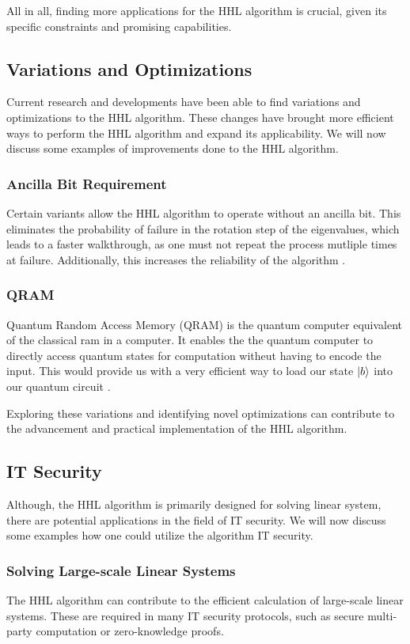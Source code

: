 All in all, finding more applications for the HHL algorithm is crucial, given its specific constraints and promising capabilities.

\subsection{Variations and Optimizations}
Current research and developments have been able to find variations and optimizations to the HHL algorithm.
These changes have brought more efficient ways to perform the HHL algorithm and expand its applicability.
We will now discuss some examples of improvements done to the HHL algorithm.

    \subsubsection{Ancilla Bit Requirement} 
    Certain variants allow the HHL algorithm to operate without an ancilla bit.
    This eliminates the probability of failure in the rotation step of the eigenvalues, which leads to a faster walkthrough, as one must not repeat the process mutliple times at failure.
    Additionally, this increases the reliability of the algorithm \cite{without_ancilla}.

    \subsubsection{QRAM}
    Quantum Random Access Memory (QRAM) is the quantum computer equivalent of the classical ram in a computer.
    It enables the the quantum computer to directly access quantum states for computation witheut having to encode the input. 
    This would provide us with a very efficient way to load our state $\ket b$ into our quantum circuit \cite{qram}.

Exploring these variations and identifying novel optimizations can contribute to the advancement and practical implementation of the HHL algorithm.


\subsection{IT Security}
Although, the HHL algorithm is primarily designed for solving linear system, there are potential applications in the field of IT security.
We will now discuss some examples how one could utilize the algorithm IT security.

    \subsubsection{Solving Large-scale Linear Systems}
    The HHL algorithm can contribute to the efficient calculation of large-scale linear systems.
    These are required in many IT security protocols, such as secure multi-party computation or zero-knowledge proofs. 

